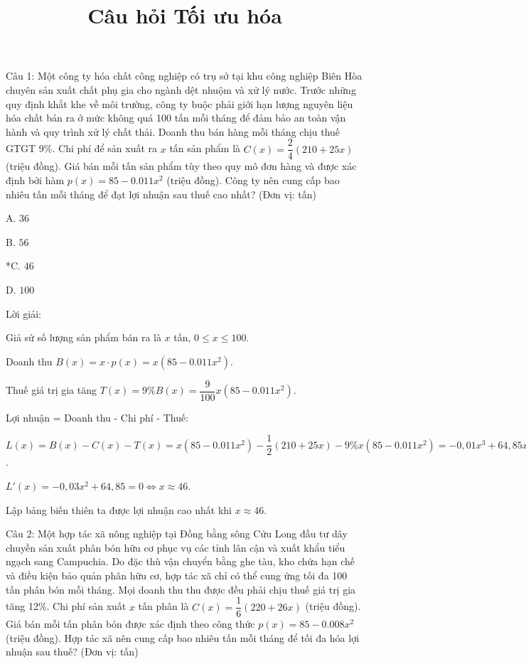 \documentclass[a4paper,12pt]{article}
\begin{document}
\title{Câu hỏi Tối ưu hóa}
\maketitle

Câu 1: Một công ty hóa chất công nghiệp có trụ sở tại khu công nghiệp Biên Hòa chuyên sản xuất chất phụ gia cho ngành dệt nhuộm và xử lý nước. Trước những quy định khắt khe về môi trường, công ty buộc phải giới hạn lượng nguyên liệu hóa chất bán ra ở mức không quá 100 tấn mỗi tháng để đảm bảo an toàn vận hành và quy trình xử lý chất thải. Doanh thu bán hàng mỗi tháng chịu thuế GTGT 9\%. Chi phí để sản xuất ra \(x\)  tấn sản phẩm là \(C(x) = \dfrac{2}{4}(210 + 25x)\) (triệu đồng). Giá bán mỗi tấn sản phẩm tùy theo quy mô đơn hàng và được xác định bởi hàm \(p(x) = 85 - 0.011x^2\) (triệu đồng). Công ty nên cung cấp bao nhiêu tấn mỗi tháng để đạt lợi nhuận sau thuế cao nhất? (Đơn vị: tấn)

A. \(36\)

B. \(56\)

*C. \(46\)

D. \(100\)

Lời giải:


Giả sử số lượng sản phẩm bán ra là \(x\) tấn, \(0 \leq x \leq 100\).

Doanh thu \(B(x) = x \cdot p(x) = x(85 - 0.011x^2)\).

Thuế giá trị gia tăng \(T(x) = 9\% B(x) = \dfrac{9}{100} x(85 - 0.011x^2)\).

Lợi nhuận = Doanh thu - Chi phí - Thuế:

\(L(x) = B(x) - C(x) - T(x) = x(85 - 0.011x^2) - \dfrac{1}{2}(210 + 25x) - 9\% x(85 - 0.011x^2) = -0,01x^3 + 64,85x + -105\).

\(L'(x) = -0,03x^2 + 64,85 = 0 \Leftrightarrow x \approx 46\).

Lập bảng biến thiên ta được lợi nhuận cao nhất khi \(x \approx 46\).




Câu 2: Một hợp tác xã nông nghiệp tại Đồng bằng sông Cửu Long đầu tư dây chuyền sản xuất phân bón hữu cơ phục vụ các tỉnh lân cận và xuất khẩu tiểu ngạch sang Campuchia. Do đặc thù vận chuyển bằng ghe tàu, kho chứa hạn chế và điều kiện bảo quản phân hữu cơ, hợp tác xã chỉ có thể cung ứng tối đa 100 tấn phân bón mỗi tháng. Mọi doanh thu thu được đều phải chịu thuế giá trị gia tăng 12\%. Chi phí sản xuất \(x\)  tấn phân là \(C(x) = \dfrac{1}{6}(220 + 26x)\) (triệu đồng). Giá bán mỗi tấn phân bón được xác định theo công thức \(p(x) = 85 - 0.008x^2\) (triệu đồng). Hợp tác xã nên cung cấp bao nhiêu tấn mỗi tháng để tối đa hóa lợi nhuận sau thuế? (Đơn vị: tấn)
\end{document}
